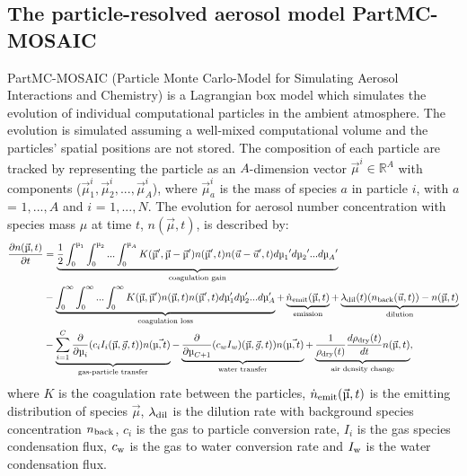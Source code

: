 \documentclass[edeposit,fullpage]{uiucthesis2009}
\begin{document}
\subsection{The particle-resolved aerosol model PartMC-MOSAIC}
PartMC-MOSAIC (Particle Monte Carlo-Model for Simulating Aerosol
Interactions and Chemistry) is a Lagrangian box model which simulates
the evolution of individual computational particles in the ambient
atmosphere. The evolution is simulated assuming a well-mixed
computational volume and the particles' spatial positions are not
stored. The composition of each particle are tracked by representing
the particle as an $A$-dimension vector $\vec{\mu}^i \in \mathbb{R}^A$
with components ($\vec{\mu}_1^i,\vec{\mu}_2^i,...,\vec{\mu}_A^i$),
where $\vec{\mu}_a^i$ is the mass of species $a$ in particle $i$, with
$a$ = $1,...,A$ and $i$ = $1,...,N$. The evolution for aerosol number
concentration with species mass $\mu$ at time $t$, $n(\vec{\mu},t)$,
is described by:
\begin{equation}
\begin{aligned}
 \frac{\partial n(\vec{\mu},t)}{\partial t} &= \underbrace{\frac{1}{2}\int_0^{\mu_1}\int_0^{\mu_2}...\int_0^{\mu_A} K(\vec{\mu}',\vec{\mu}-\vec{\mu}')n(\vec{\mu}',t)n(\vec{u}-\vec{u}',t)d{\mu_1}'d{\mu_2}'...d{\mu_A}'}_\text{coagulation gain}\\
& - \underbrace{\int_0^\infty\int_0^\infty...\int_0^\infty K(\vec{\mu},\vec{\mu}')n(\vec{\mu},t)n(\vec{\mu}',t)d\mu_1'd\mu_2'...d\mu_A' }_\text{coagulation loss} + \underbrace{\dot{n}_{\rm emit}(\vec{\mu},t)}_\text{emission} + \underbrace{\lambda_{\rm dil}(t)(n_{\rm back}(\vec{u},t))-n(\vec{\mu},t)}_\text{dilution}\\
&-\underbrace{\sum_{i=1}^{C}\frac{\partial}{\partial\mu_i}(c_iI_i(\vec{\mu},\vec{g},t))n(\vec{\mu,t})}_\text{gas-particle transfer} - \underbrace{\frac{\partial}{\partial\mu_{C+1}}(c_wI_w)(\vec{\mu},\vec{g},t))n(\vec{\mu,t})}_\text{water transfer} + \underbrace{\frac{1}{\rho_{\rm dry}(t)}\frac{d\rho_{\rm dry}(t)}{dt}n(\vec{\mu},t)}_\text{air density change},
\end{aligned}
\label{eq:partmc}
\end{equation}
where $K$ is the coagulation rate between the particles, $\dot{n}_{\rm
  emit}(\vec{\mu},t)$ is the emitting distribution of species
$\vec{\mu}$, $\lambda_{\rm dil}$ is the dilution rate with background
species concentration $n_{\rm back}$, $c_i$ is the gas to particle
conversion rate, $I_i$ is the gas species condensation flux, $c_{\rm
  w}$ is the gas to water conversion rate and $I_{\rm w}$ is the water
condensation flux.
\end{document}
